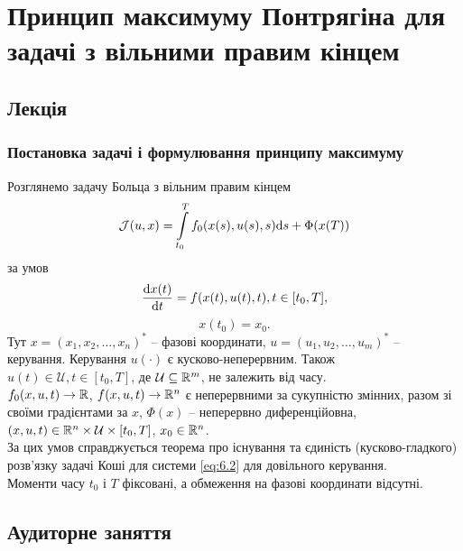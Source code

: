 \setcounter{section}{6}

\section{Принцип максимуму Понтрягіна для задачі з вільними правим кінцем}

\subsection{Лекція}

\subsubsection{Постановка задачі і формулювання принципу максимуму}

Розглянемо задачу Больца з вільним правим кінцем
\begin{equation}
    \label{eq:6.1}
    \mathcal{J}(u, x) = \displaystyle\int\limits_{t_0}^T f_0 (x(s), u(s), s) \mathrm{d} s + \Phi(x(T))
\end{equation}
за умов
\begin{equation}
    \label{eq:6.2}
    \dfrac{\mathrm{d} x(t)}{\mathrm{d} t} = f(x(t), u(t), t), t \in [t_0, T],
\end{equation}
\begin{equation}
    \label{eq:6.3}
    x(t_0) = x_0.
\end{equation}
Тут $x = (x_1, x_2, \ldots, x_n)^*$ -- фазові координати, $u = (u_1, u_2, \ldots, u_m)^*$ -- керування. Керування $u(\cdot)$ є кусково-неперервним. Також $u(t) \in \mathcal{U}, t \in [t_0, T]$, де $\mathcal{U} \subseteq \mathbb{R}^m$, не залежить від часу. \\

$f_0(x, u, t) \to \mathbb{R}$, $f(x, u, t) \to \mathbb{R}^n$ є неперервними за сукупністю змінних, разом зі своїми градієнтами за $x$, $\Phi(x)$ -- неперервно диференційовна, $(x, u, t) \in \mathbb{R}^n \times \mathcal{U} \times [t_0, T]$, $x_0 \in \mathbb{R}^n$. \\

За цих умов справджується теорема про існування та єдиність (кусково-гладкого) розв'язку задачі Коші для системи \ref{eq:6.2} для довільного керування. \\

Моменти часу $t_0$ і $T$ фіксовані, а обмеження на фазові координати відсутні.

\subsection{Аудиторне заняття}

